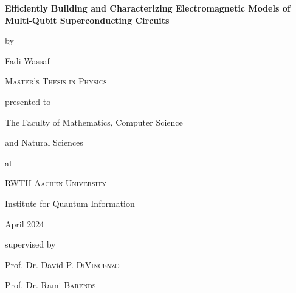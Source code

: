 
\begin{titlepage}
    \begin{center}

    \end{center}
    \begin{center}
    \vspace*{\fill}
    {\Huge \textbf{Efficiently Building and Characterizing Electromagnetic Models of Multi-Qubit Superconducting Circuits} \par }
    \vspace{2cm}
    {\large by \par}
    \vspace{1cm}
    {\LARGE Fadi Wassaf \par}
    \vspace{2.5cm}
    {\huge \textsc{Master's Thesis in Physics} \par}
    \vspace{2.5cm}
    {\large presented to \par }
    \vspace{0.5cm}
    {\large The Faculty of Mathematics, Computer Science \par and Natural Sciences \par}
    \vspace{0.5cm}
    {\large at \par}
    \vspace{0.5cm}
    {\Large \textsc{RWTH Aachen University} \par}
    \vspace{2cm}
    {\large Institute for Quantum Information \par}
    {\Large April 2024 \par}
    \vspace{1cm}
    {\large supervised by \par}
    \vspace{0.5cm}
    {\large Prof. Dr. David P. \textsc{DiVincenzo} \par Prof. Dr. Rami \textsc{Barends}}
    \vspace*{\fill}    
    \end{center}
\end{titlepage}

\restoregeometry
\newpage
\thispagestyle{empty}
\mbox{}
\newpage